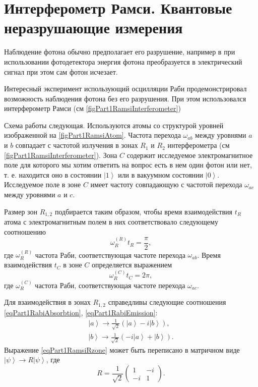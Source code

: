 \section{Интерферометр Рамси. Квантовые неразрушающие измерения}

Наблюдение фотона обычно предполагает его разрушение, например в
при использовании фотодетектора энергия фотона преобразуется в
электрический сигнал при этом сам фотон исчезает.

Интересный эксперимент \cite{Nogues1999Nv400p239} использующий
осцилляции Раби продемонстрировал возможность наблюдения фотона без
его разрушения. При этом использовался интерферометр Рамси (см
\autoref{figPart1RamsiInterferometer})





Схема работы следующая. Используются атомы со структурой уровней
изображенной на \autoref{figPart1RamsiAtom}. Частота перехода
$\omega_{ab}$ между уровнями $a$ и $b$ совпадает с частотой излучения
в зонах $R_1$ и $R_2$ интерферометра  (см
\autoref{figPart1RamsiInterferometer}). Зона $C$ содержит исследуемое
электромагнитное поле для которого мы хотим ответить на вопрос есть в
нем один фотон или нет, т. е. находится оно в состоянии
$\left|1\right>$ или в вакуумном состоянии
$\left|0\right>$. Исследуемое поле в зоне $C$ имеет частоту
совпадающую с частотой перехода $\omega_{ac}$ между уровнями $a$ и
$c$.  

Размер зон $R_{1,2}$ подбирается таким образом, чтобы время
взаимодействия $t_R$ атома с электромагнитным полем в них соответствовало
следующему соотношению
\begin{equation}
  \omega_R^{(R)} t_R = \frac{\pi}{2},
  \nonumber
\end{equation}
где $\omega_R^{(R)}$ частота Раби, соответствующая частоте перехода
$\omega_{ab}$.
Время взаимодействия $t_C$ в зоне $C$ определяется выражением
\begin{equation}
  \omega_R^{(C)} t_C = 2 \pi,
  \nonumber
\end{equation}
где $\omega_R^{(C)}$ частота Раби, соответствующая частоте перехода
$\omega_{ac}$.

Для взаимодействия в зонах $R_{1,2}$ справедливы следующие
соотношения \eqref{eqPart1RabiAbsorbtion}, \ref{eqPart1RabiEmission}:
\begin{eqnarray}
  \left|a\right> \rightarrow \frac{1}{\sqrt{2}}\left(
  \left|a\right> - i \left|b\right>  
  \right),
  \nonumber \\
  \left|b\right> \rightarrow \frac{1}{\sqrt{2}}\left(
  -i \left|a\right> + \left|b\right>  
  \right).
  \label{eqPart1RamsiRzone}
\end{eqnarray}
Выражение \eqref{eqPart1RamsiRzone} может быть переписано в матричном
виде $\left|\psi\right> \rightarrow R \left|\psi\right>$,
где
\[
R = \frac{1}{\sqrt{2}} \left(
\begin{array} {cc}
1 & -i
\\
-i & 1 
\end{array}
\right).
\]

